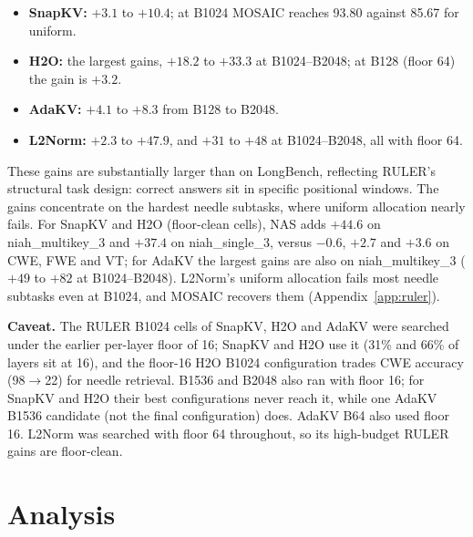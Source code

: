 \documentclass[11pt]{article}
\begin{document}
\begin{itemize}
\item \textbf{SnapKV:} $+3.1$ to $+10.4$; at B1024 MOSAIC reaches 93.80 against 85.67 for uniform.
\item \textbf{H2O:} the largest gains, $+18.2$ to $+33.3$ at B1024--B2048; at B128 (floor 64) the gain is $+3.2$.
\item \textbf{AdaKV:} $+4.1$ to $+8.3$ from B128 to B2048.
\item \textbf{L2Norm:} $+2.3$ to $+47.9$, and $+31$ to $+48$ at B1024--B2048, all with floor 64.
\end{itemize}

These gains are substantially larger than on LongBench, reflecting RULER's structural task design: correct answers sit in specific positional windows. The gains concentrate on the hardest needle subtasks, where uniform allocation nearly fails. For SnapKV and H2O (floor-clean cells), NAS adds $+44.6$ on niah\_multikey\_3 and $+37.4$ on niah\_single\_3, versus $-0.6$, $+2.7$ and $+3.6$ on CWE, FWE and VT; for AdaKV the largest gains are also on niah\_multikey\_3 ($+49$ to $+82$ at B1024--B2048). L2Norm's uniform allocation fails most needle subtasks even at B1024, and MOSAIC recovers them (Appendix~\ref{app:ruler}).

\textbf{Caveat.} The RULER B1024 cells of SnapKV, H2O and AdaKV were searched under the earlier per-layer floor of 16; SnapKV and H2O use it (31\% and 66\% of layers sit at 16), and the floor-16 H2O B1024 configuration trades CWE accuracy (98$\rightarrow$22) for needle retrieval. B1536 and B2048 also ran with floor 16; for SnapKV and H2O their best configurations never reach it, while one AdaKV B1536 candidate (not the final configuration) does. AdaKV B64 also used floor 16. L2Norm was searched with floor 64 throughout, so its high-budget RULER gains are floor-clean.




\section{Analysis}

\end{document}
